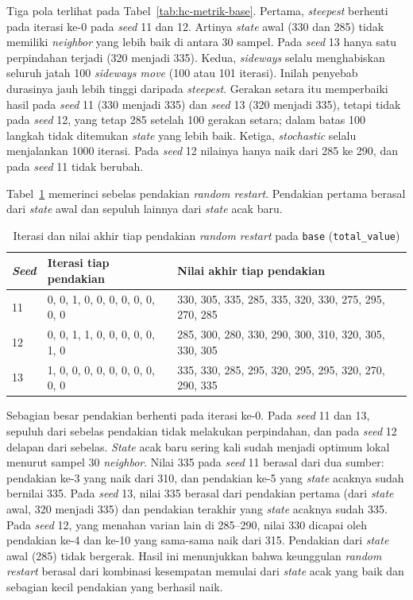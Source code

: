 Tiga pola terlihat pada Tabel~\ref{tab:hc-metrik-base}. Pertama, \textit{steepest} berhenti pada iterasi ke-0 pada \textit{seed} 11 dan 12. Artinya \textit{state} awal (330 dan 285) tidak memiliki \textit{neighbor} yang lebih baik di antara 30 sampel. Pada \textit{seed} 13 hanya satu perpindahan terjadi (320 menjadi 335). Kedua, \textit{sideways} selalu menghabiskan seluruh jatah 100 \textit{sideways move} (100 atau 101 iterasi). Inilah penyebab durasinya jauh lebih tinggi daripada \textit{steepest}. Gerakan setara itu memperbaiki hasil pada \textit{seed} 11 (330 menjadi 335) dan \textit{seed} 13 (320 menjadi 335), tetapi tidak pada \textit{seed} 12, yang tetap 285 setelah 100 gerakan setara; dalam batas 100 langkah tidak ditemukan \textit{state} yang lebih baik. Ketiga, \textit{stochastic} selalu menjalankan 1000 iterasi. Pada \textit{seed} 12 nilainya hanya naik dari 285 ke 290, dan pada \textit{seed} 11 tidak berubah.

Tabel~\ref{tab:hc-restart-base} memerinci sebelas pendakian \textit{random restart}. Pendakian pertama berasal dari \textit{state} awal dan sepuluh lainnya dari \textit{state} acak baru.

\begin{table}[H]
    \centering
    \small
    \begin{tabular}{@{}lp{4.6cm}p{6.4cm}@{}}
        \toprule
        \textit{Seed} & Iterasi tiap pendakian & Nilai akhir tiap pendakian \\
        \midrule
        11 & 0, 0, 1, 0, 0, 0, 0, 0, 0, 0, 0 & 330, 305, 335, 285, 335, 320, 330, 275, 295, 270, 285 \\
        12 & 0, 0, 1, 1, 0, 0, 0, 0, 0, 1, 0 & 285, 300, 280, 330, 290, 300, 310, 320, 305, 330, 305 \\
        13 & 1, 0, 0, 0, 0, 0, 0, 0, 0, 0, 0 & 335, 330, 285, 295, 320, 295, 295, 320, 270, 290, 335 \\
        \bottomrule
    \end{tabular}
    \caption{Iterasi dan nilai akhir tiap pendakian \textit{random restart} pada \texttt{base} (\texttt{total\_value})}
    \label{tab:hc-restart-base}
\end{table}

Sebagian besar pendakian berhenti pada iterasi ke-0. Pada \textit{seed} 11 dan 13, sepuluh dari sebelas pendakian tidak melakukan perpindahan, dan pada \textit{seed} 12 delapan dari sebelas. \textit{State} acak baru sering kali sudah menjadi optimum lokal menurut sampel 30 \textit{neighbor}. Nilai 335 pada \textit{seed} 11 berasal dari dua sumber: pendakian ke-3 yang naik dari 310, dan pendakian ke-5 yang \textit{state} acaknya sudah bernilai 335. Pada \textit{seed} 13, nilai 335 berasal dari pendakian pertama (dari \textit{state} awal, 320 menjadi 335) dan pendakian terakhir yang \textit{state} acaknya sudah 335. Pada \textit{seed} 12, yang menahan varian lain di 285--290, nilai 330 dicapai oleh pendakian ke-4 dan ke-10 yang sama-sama naik dari 315. Pendakian dari \textit{state} awal (285) tidak bergerak. Hasil ini menunjukkan bahwa keunggulan \textit{random restart} berasal dari kombinasi kesempatan memulai dari \textit{state} acak yang baik dan sebagian kecil pendakian yang berhasil naik.

